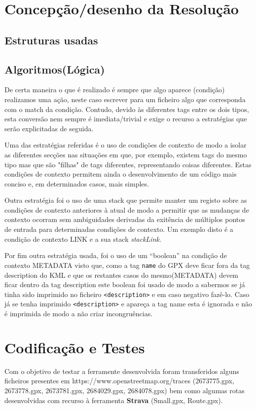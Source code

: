 \documentclass{llncs}
\begin{document}
\section{Concepção/desenho da Resolução}

\subsection{Estruturas usadas}

\subsection{Algoritmos(Lógica)}
De certa maneira o que é realizado é sempre que algo aparece (condição) realizamos uma ação, neste caso escrever para um ficheiro algo que corresponda com o match da condição. Contudo, devido às diferentes tags entre os dois tipos, esta conversão nem sempre é imediata/trivial e exige o recurso a estratégias que serão explicitadas de seguida.

Uma das estratégias referidas é o uso de condições de contexto de modo a isolar as diferentes secções nas situações em que, por exemplo, existem tags do mesmo tipo mas que são "filhas" de tags diferentes, representando coisas diferentes. Estas condições de contexto permitem ainda o desenvolvimento de um código mais conciso e, em determinados casos, mais simples.

Outra estratégia foi o uso de uma stack que permite manter um registo sobre as condições de contexto anteriores à atual de modo a permitir que as mudanças de contexto ocorram sem ambiguidades derivadas da exitência de múltiplos pontos de entrada para determinadas condições de contexto. Um exemplo disto é a condição de contexto LINK e a sua stack \textit{stackLink}.

Por fim outra estratégia usada, foi o uso de um ``boolean'' na condição de contexto METADATA visto que, como a tag \texttt{name} do GPX deve ficar fora da tag description do KML e que os restantes casos do mesmo(METADATA) devem ficar dentro da tag description este boolean foi usado de modo a sabermos se já tinha sido imprimido no ficheiro \verb|<description>| e em caso negativo fazê-lo. Caso já se tenha imprimido \verb|<description>| e apareça a tag name esta é ignorada e não é imprimida de modo a não criar incongruências.

\section{Codificação e Testes}
Com o objetivo de testar a ferramente desenvolvida foram transferidos alguns ficheiros presentes em https://www.openstreetmap.org/traces (2673775.gpx, 2673778.gpx, 2673781.gpx, 2684029.gpx, 2684078.gpx) bem como algumas rotas desenvolvidas com recurso à ferramenta \textbf{Strava} (Small.gpx, Route.gpx).
\end{document}
